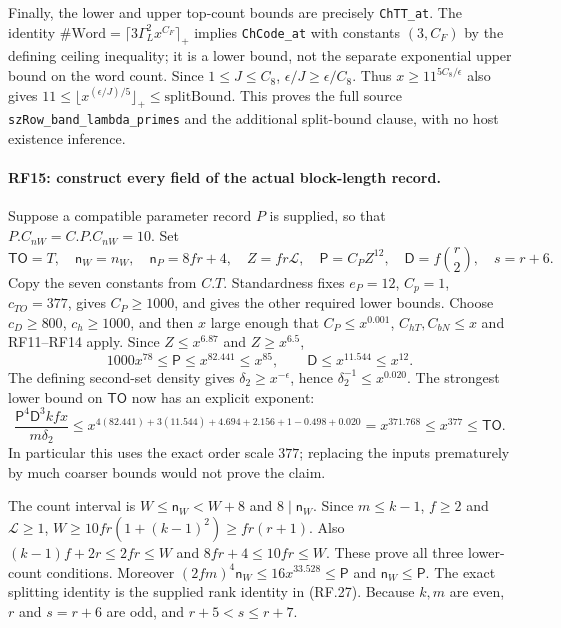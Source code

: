 \documentclass[11pt,a4paper]{article}
\numberwithin{equation}{section}
\theoremstyle{remark}\newtheorem{remark}[theorem]{Remark}
\begin{document}
Finally, the lower and upper top-count bounds are precisely
\texttt{ChTT\_\allowbreak at}. The identity
$\#\mathrm{Word}=\lceil3\Gamma_L^2x^{C_F}\rceil_+$ implies
\texttt{ChCode\_\allowbreak at} with constants $(3,C_F)$ by the defining ceiling
inequality; it is a lower bound, not the separate exponential upper
bound on the word count. Since $1\leq J\leq C_8$,
$\epsilon/J\geq\epsilon/C_8$. Thus
$x\geq11^{5C_8/\epsilon}$ also gives
$11\leq\lfloor x^{(\epsilon/J)/5}\rfloor_+\leq\mathrm{splitBound}$.
This proves the full source \texttt{szRow\_\allowbreak band\_\allowbreak lambda\_\allowbreak primes}
and the additional split-bound clause, with no host existence inference.

\paragraph{RF15: construct every field of the actual block-length record.}
Suppose a compatible parameter record $P$ is supplied, so that
$P.C_{nW}=C.P.C_{nW}=10$. Set
\[
 \mathsf{TO}=T,\quad \mathsf n_W=n_W,\quad
 \mathsf n_P=8fr+4,\quad Z=fr\mathcal L,\quad
 \mathsf P=C_PZ^{12},\quad \mathsf D=f\binom r2,
 \quad s=r+6.                                                \tag{RF.39}
\]
Copy the seven constants from $C.T$. Standardness fixes
$e_P=12$, $C_p=1$, $c_{TO}=377$, gives $C_P\geq1000$, and gives the
other required lower bounds. Choose $c_D\geq800$, $c_h\geq1000$,
and then $x$ large enough that $C_P\leq x^{0.001}$,
$C_{hT},C_{bN}\leq x$ and RF11--RF14 apply.
Since $Z\leq x^{6.87}$ and $Z\geq x^{6.5}$,
\[
 1000x^{78}\leq\mathsf P\leq x^{82.441}\leq x^{85},
 \qquad \mathsf D\leq x^{11.544}\leq x^{12}.                \tag{RF.40}
\]
The defining second-set density gives
$\delta_2\geq x^{-\epsilon}$, hence
$\delta_2^{-1}\leq x^{0.020}$.
The strongest lower bound on $\mathsf{TO}$ now has an explicit exponent:
\[
 \frac{\mathsf P^4\mathsf D^3kf x}{m\delta_2}
 \leq x^{4(82.441)+3(11.544)+4.694+2.156+1-0.498+0.020}
 =x^{371.768}\leq x^{377}\leq\mathsf{TO}.                  \tag{RF.41}
\]
In particular this uses the exact order scale $377$; replacing the
inputs prematurely by much coarser bounds would not prove the claim.

The count interval is $W\leq\mathsf n_W<W+8$ and
$8\mid\mathsf n_W$. Since $m\leq k-1$, $f\geq2$ and
$\mathcal L\geq1$,
$W\geq10fr(1+(k-1)^2)\geq fr(r+1)$.
Also $(k-1)f+2r\leq2fr\leq W$ and $8fr+4\leq10fr\leq W$.
These prove all three lower-count conditions.
Moreover
$(2fm)^4\mathsf n_W\leq16x^{33.528}\leq\mathsf P$ and
$\mathsf n_W\leq\mathsf P$.
The exact splitting identity is the supplied rank identity in (RF.27).
Because $k,m$ are even, $r$ and $s=r+6$ are odd, and
$r+5<s\leq r+7$.
\end{document}
